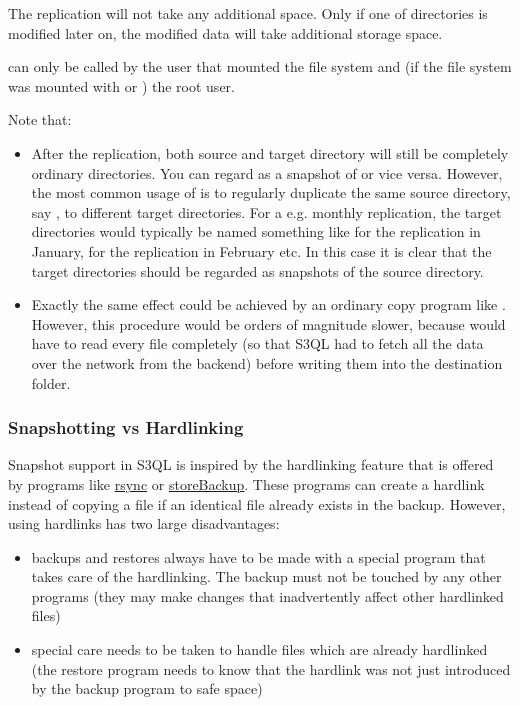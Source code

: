 \documentclass[letterpaper,10pt,english]{sphinxmanual}
\begin{document}
The replication will not take any additional space. Only if one of
directories is modified later on, the modified data will take
additional storage space.

 can only be called by the user that mounted the file system
and (if the file system was mounted with  or )
the root user.

Note that:
\begin{itemize}
\item {} 
After the replication, both source and target directory will still
be completely ordinary directories. You can regard  as a
snapshot of  or vice versa. However, the most common
usage of  is to regularly duplicate the same source
directory, say , to different target directories. For a
e.g. monthly replication, the target directories would typically be
named something like  for the replication in
January,  for the replication in February etc.
In this case it is clear that the target directories should be
regarded as snapshots of the source directory.

\item {} 
Exactly the same effect could be achieved by an ordinary copy
program like . However, this procedure would be orders of
magnitude slower, because  would have to read every file
completely (so that S3QL had to fetch all the data over the network
from the backend) before writing them into the destination folder.

\end{itemize}


\subsubsection{Snapshotting vs Hardlinking}
\label{man/cp:snapshotting-vs-hardlinking}
Snapshot support in S3QL is inspired by the hardlinking feature that
is offered by programs like \href{http://www.samba.org/rsync}{rsync} or
\href{http://savannah.nongnu.org/projects/storebackup}{storeBackup}.
These programs can create a hardlink instead of copying a file if an
identical file already exists in the backup. However, using hardlinks
has two large disadvantages:
\begin{itemize}
\item {} 
backups and restores always have to be made with a special program
that takes care of the hardlinking. The backup must not be touched
by any other programs (they may make changes that inadvertently
affect other hardlinked files)

\item {} 
special care needs to be taken to handle files which are already
hardlinked (the restore program needs to know that the hardlink was
not just introduced by the backup program to safe space)

\end{itemize}
\end{document}
